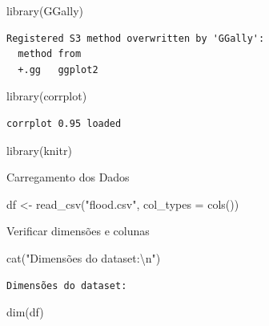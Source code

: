 \documentclass[
  letterpaper,
  DIV=11,
  numbers=noendperiod]{scrartcl}
\newenvironment{Shaded}{\begin{snugshade}}{\end{snugshade}}
\newcommand{\AttributeTok}[1]{\textcolor[rgb]{0.40,0.45,0.13}{#1}}
\newcommand{\FunctionTok}[1]{\textcolor[rgb]{0.28,0.35,0.67}{#1}}
\newcommand{\NormalTok}[1]{\textcolor[rgb]{0.00,0.23,0.31}{#1}}
\newcommand{\OtherTok}[1]{\textcolor[rgb]{0.00,0.23,0.31}{#1}}
\newcommand{\SpecialCharTok}[1]{\textcolor[rgb]{0.37,0.37,0.37}{#1}}
\newcommand{\StringTok}[1]{\textcolor[rgb]{0.13,0.47,0.30}{#1}}
\begin{document}
\begin{Shaded}
\begin{Highlighting}[]
\FunctionTok{library}\NormalTok{(GGally)       }
\end{Highlighting}
\end{Shaded}

\begin{verbatim}
Registered S3 method overwritten by 'GGally':
  method from   
  +.gg   ggplot2
\end{verbatim}

\begin{Shaded}
\begin{Highlighting}[]
\FunctionTok{library}\NormalTok{(corrplot)     }
\end{Highlighting}
\end{Shaded}

\begin{verbatim}
corrplot 0.95 loaded
\end{verbatim}

\begin{Shaded}
\begin{Highlighting}[]
\FunctionTok{library}\NormalTok{(knitr)        }
\end{Highlighting}
\end{Shaded}

Carregamento dos Dados

\begin{Shaded}
\begin{Highlighting}[]
\NormalTok{df }\OtherTok{\textless{}{-}} \FunctionTok{read\_csv}\NormalTok{(}\StringTok{"flood.csv"}\NormalTok{, }\AttributeTok{col\_types =} \FunctionTok{cols}\NormalTok{())}
\end{Highlighting}
\end{Shaded}

Verificar dimensões e colunas

\begin{Shaded}
\begin{Highlighting}[]
\FunctionTok{cat}\NormalTok{(}\StringTok{"Dimensões do dataset:}\SpecialCharTok{\textbackslash{}n}\StringTok{"}\NormalTok{)}
\end{Highlighting}
\end{Shaded}

\begin{verbatim}
Dimensões do dataset:
\end{verbatim}

\begin{Shaded}
\begin{Highlighting}[]
\FunctionTok{dim}\NormalTok{(df)    }
\end{Highlighting}
\end{Shaded}
\end{document}
